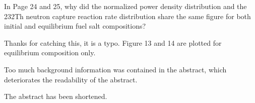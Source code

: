 \documentclass[answers,11pt]{exam}
\begin{document}
\begin{questions}
        \question  In Page 24 and 25, why did the normalized power density 
        distribution and the 232Th neutron capture reaction rate distribution 
        share the same figure for both initial and equilibrium fuel salt 
        compositions?
        \begin{solution}
                Thanks for catching this, it is a typo. Figure 13 and 14 are plotted 
                for equilibrium composition only.            	    
        \end{solution}

        \question  Too much background information was contained in the 
        abstract, which deteriorates the readability of the abstract.
        \begin{solution}
                The abstract has been shortened.
        \end{solution}

\end{questions}


\end{document}
